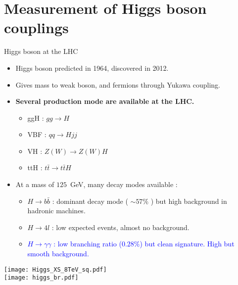 \documentclass[a4paper]{beamer}
\begin{document}
\section{Measurement of Higgs boson couplings}
\begin{frame}{Higgs boson at the LHC}
  \begin{minipage}{0.6\linewidth}
  \begin{itemize}
  \item Higgs boson predicted in 1964, discovered in 2012.
  \item Gives mass to weak boson, and fermions through Yukawa coupling.
  \item {\bf Several production mode are available at the LHC.}
    \begin{itemize}
      \item ggH : $gg\rightarrow H$
      \item VBF : $qq\rightarrow Hjj$ 
      \item VH : $Z(W)\rightarrow Z(W)H$
      \item ttH : $t\bar{t}\rightarrow t\bar{t}H$
    \end{itemize}
  \item At a mass of $125$~GeV, many decay modes available : 
    \begin{itemize}
    \item $H\rightarrow b\bar{b}$ : dominant decay mode ( $\sim 57\%$ ) but high background in hadronic machines.
    \item $H\rightarrow 4l$ : low expected events, almost no background.
    \item \textcolor{blue}{ $H\rightarrow\gamma\gamma$ : low branching ratio ($0.28\%$) but clean signature. High but smooth background.}
    \end{itemize}
  \end{itemize}
\end{minipage}
  \begin{minipage}{0.33\linewidth}
    \texttt{[image: Higgs\_XS\_8TeV\_sq.pdf]}\\
    \texttt{[image: higgs\_br.pdf]}\\
\end{minipage}
\end{frame}
\end{document}
